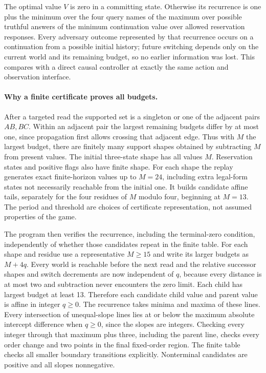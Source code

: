 \documentclass[11pt]{article}
\begin{document}
The optimal value $V$ is zero in a committing state. Otherwise its recurrence is one plus the minimum over the four query names of the maximum over possible truthful answers of the minimum continuation value over allowed reservation responses. Every adversary outcome represented by that recurrence occurs on a continuation from a possible initial history; future switching depends only on the current world and its remaining budget, so no earlier information was lost. This compares with a direct causal controller at exactly the same action and observation interface.

\paragraph{Why a finite certificate proves all budgets.}
After a targeted read the supported set is a singleton or one of the adjacent pairs $AB,BC$. Within an adjacent pair the largest remaining budgets differ by at most one, since propagation first allows crossing that adjacent edge. Thus with $M$ the largest budget, there are finitely many support shapes obtained by subtracting $M$ from present values. The initial three-state shape has all values $M$. Reservation states and positive flags also have finite shape. For each shape the replay generates exact finite-horizon values up to $M=24$, including extra legal-form states not necessarily reachable from the initial one. It builds candidate affine tails, separately for the four residues of $M$ modulo four, beginning at $M=13$. The period and threshold are choices of certificate representation, not assumed properties of the game.

The program then verifies the recurrence, including the terminal-zero condition, independently of whether those candidates repeat in the finite table. For each shape and residue use a representative $M\ge 15$ and write its larger budgets as $M+4q$. Every world is reachable before the next read and the relative successor shapes and switch decrements are now independent of $q$, because every distance is at most two and subtraction never encounters the zero limit. Each child has largest budget at least 13. Therefore each candidate child value and parent value is affine in integer $q\ge0$. The recurrence takes minima and maxima of these lines. Every intersection of unequal-slope lines lies at or below the maximum absolute intercept difference when $q\ge0$, since the slopes are integers. Checking every integer through that maximum plus three, including the parent line, checks every order change and two points in the final fixed-order region. The finite table checks all smaller boundary transitions explicitly. Nonterminal candidates are positive and all slopes nonnegative.
\end{document}
